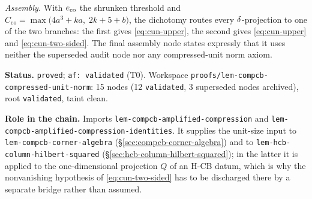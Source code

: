 \emph{Assembly.} With $e_{\mathrm{co}}$ the shrunken threshold and
$C_{\mathrm{co}}=\max\bigl(4a^3+ka,\;2k+5+b\bigr)$, the dichotomy routes every
$\delta$-projection to one of the two branches: the first gives \eqref{eq:cun-upper}, the
second gives \eqref{eq:cun-upper} and \eqref{eq:cun-two-sided}. The final assembly node
states expressly that it uses neither the superseded audit node nor any compressed-unit
norm axiom.

\medskip
\noindent\textbf{Status.} \texttt{proved}; \texttt{af: validated} (T0). Workspace
\texttt{proofs/lem-compcb-compressed-unit-norm}: 15 nodes (12 \texttt{validated}, 3
superseded nodes archived), root \texttt{validated}, taint clean.

\noindent\textbf{Role in the chain.} Imports
\texttt{lem-compcb-amplified-compression} and
\texttt{lem-compcb-amplified-compression-identities}. It supplies the unit-size input to
\texttt{lem-compcb-corner-algebra} (\S\ref{sec:compcb-corner-algebra}) and to
\texttt{lem-hcb-column-hilbert-squared} (\S\ref{sec:hcb-column-hilbert-squared}); in the
latter it is applied to the one-dimensional projection $Q$ of an H-CB datum, which is why
the nonvanishing hypothesis of \eqref{eq:cun-two-sided} has to be discharged there by a
separate bridge rather than assumed.
